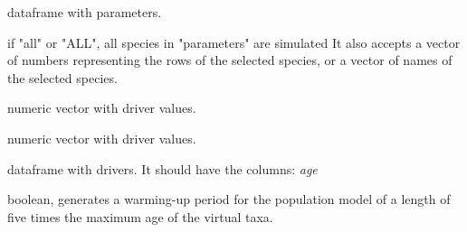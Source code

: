 \documentclass[letterpaper]{book}
\begin{document}
%
\begin{Arguments}
\begin{ldescription}
\item[\code{parameters}] dataframe with parameters.

\item[\code{species}] if "all" or "ALL", all species in "parameters" are simulated It also accepts a vector of numbers representing the rows of the selected species, or a vector of names of the selected species.

\item[\code{driver.A}] numeric vector with driver values.

\item[\code{driver.B}] numeric vector with driver values.

\item[\code{drivers}] dataframe with drivers. It should have the columns: \emph{age}

\item[\code{burnin}] boolean, generates a warming-up period for the population model of a length of five times the maximum age of the virtual taxa.
\end{ldescription}
\end{Arguments}
%
\end{document}
